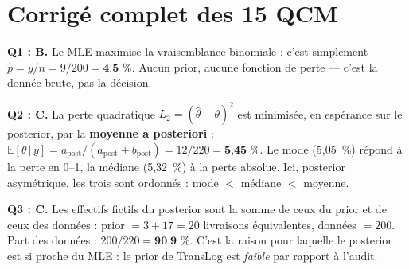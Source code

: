 \documentclass[11pt,a4paper]{article}
\newcommand{\given}{\,\vert\,}
\begin{document}
\newpage
\section{Corrigé complet des 15 QCM}

\begin{corrigebox}
\textbf{Q1 : B.} Le MLE maximise la vraisemblance binomiale : c'est simplement
$\hat p = y/n = 9/200 = \textbf{4{,}5~\%}$. Aucun prior, aucune fonction de
perte --- c'est la donnée brute, pas la décision.

\textbf{Q2 : C.} La perte quadratique $L_2 = (\hat\theta - \theta)^2$ est
minimisée, en espérance sur le posterior, par la \textbf{moyenne a posteriori} :
$\mathbb{E}[\theta \given y] = a_{\text{post}}/(a_{\text{post}} + b_{\text{post}})
= 12/220 = \textbf{5{,}45~\%}$. Le mode (5,05~\%) répond à la perte en 0--1, la
médiane (5,32~\%) à la perte absolue. Ici, posterior asymétrique, les trois
sont ordonnés : mode $<$ médiane $<$ moyenne.

\textbf{Q3 : C.} Les effectifs fictifs du posterior sont la somme de ceux du
prior et de ceux des données : prior $= 3+17 = 20$ livraisons équivalentes,
données $= 200$. Part des données : $200/220 = \textbf{90{,}9~\%}$. C'est la
raison pour laquelle le posterior est si proche du MLE : le prior de TransLog
est \emph{faible} par rapport à l'audit.
\end{corrigebox}
\end{document}
